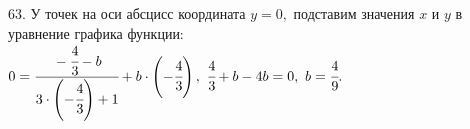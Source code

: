 63. У точек на оси абсцисс координата $y=0,$ подставим значения $x$ и $y$ в уравнение графика функции:
$0=\cfrac{-\cfrac{4}{3}-b}{3\cdot\left(-\cfrac{4}{3}\right)+1}+b\cdot\left(-\cfrac{4}{3}\right),\ \cfrac{4}{3}+b-4b=0,\ b=\cfrac{4}{9}.$\\

